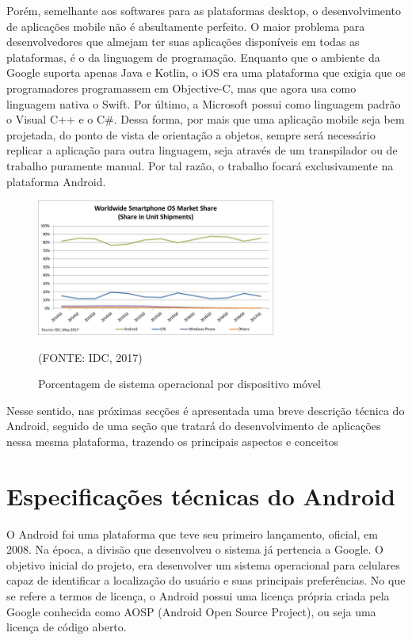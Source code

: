 \documentclass[
    12pt,       %
    openright,      %
    twoside,      %
    a4paper,      %
    english,      %
    french,       %
    spanish,      %
    brazil,       %
    ]{abntex2}
\begin{document}
      Porém, semelhante aos softwares para as plataformas desktop, o desenvolvimento de aplicações
      mobile não é absultamente perfeito. O maior problema para desenvolvedores que almejam
      ter suas aplicações disponíveis em todas as plataformas, é o da linguagem de programação.
      Enquanto que o ambiente da Google suporta apenas Java e Kotlin, o iOS era uma plataforma
      que exigia que os programadores programassem em Objective-C, mas que agora usa como linguagem
      nativa o Swift. Por último, a Microsoft possui como linguagem padrão o Visual C++ e o C\#.
      Dessa forma, por mais que uma aplicação mobile seja bem projetada, do ponto de vista de
      orientação a objetos, sempre será necessário replicar a aplicação para outra linguagem,
      seja através de um transpilador ou de trabalho puramente manual. Por tal razão, o
      trabalho focará exclusivamente na plataforma Android.

      \begin{figure}[htbp]
            \begin{center}
                \includegraphics[width=0.7\textwidth]{img/osPercentage.jpg}
            \end{center}
        \caption{\label{fig:passaro}Porcentagem de sistema operacional por dispositivo móvel}
        \begin{center}(FONTE: IDC, 2017)\end{center}
      \end{figure}

      Nesse sentido, nas próximas secções é apresentada uma breve descrição técnica do
      Android, seguido de uma seção que tratará do desenvolvimento de aplicações nessa
      mesma plataforma, trazendo os principais aspectos e conceitos

      \section{Especificações técnicas do Android}
        O Android foi uma plataforma que teve seu primeiro lançamento, oficial, em 2008. Na época,
        a divisão que desenvolveu o sistema já pertencia a Google. O objetivo inicial do projeto,
        era desenvolver um sistema operacional para celulares capaz de identificar a localização
        do usuário e suas principais preferências. No que se refere a termos de licença, o Android
        possui uma licença própria criada pela Google conhecida como AOSP (Android Open Source
        Project), ou seja uma licença de código aberto.
\end{document}
